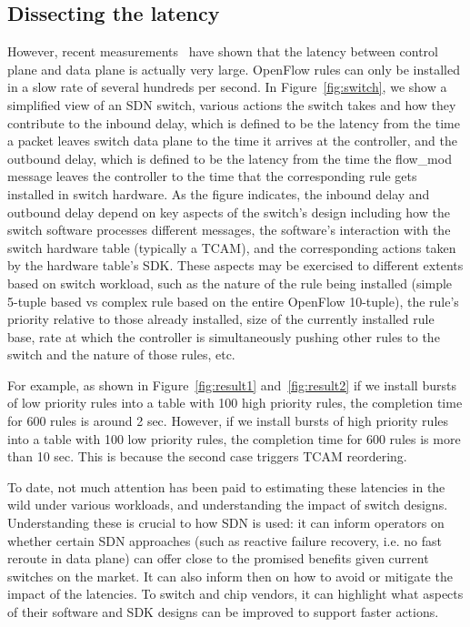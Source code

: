 \documentclass[onecolumn]{sig-alternate-10pt-onecolumn}
\begin{document}
\subsection{Dissecting the latency}
However, recent measurements~\cite{ucsdHiFi13} have shown that the latency between control plane
and data plane is actually very large. OpenFlow rules can only be installed in a
slow rate of several hundreds per second. 
In Figure~\ref{fig:switch}, we show a simplified view of an SDN switch,
various actions the switch takes and how they contribute to the inbound delay,
which is defined to be the latency from the time a packet leaves switch
data plane to the time it arrives at the controller, and the outbound delay,
 which is defined to be the latency 
from the time the flow\_mod message leaves the controller to the time that
the corresponding rule gets installed in switch hardware. As
the figure indicates, the inbound delay and outbound delay depend on key aspects of
the switch's design including how the switch software processes different
messages, the software's interaction with the switch hardware table (typically a
TCAM), and the corresponding actions taken by the hardware table's SDK.  These
aspects may be exercised to different extents based on switch workload, such as
the nature of the rule being installed (simple 5-tuple based vs complex rule
based on the entire OpenFlow 10-tuple), the rule's priority relative to those
already installed, size of the currently installed rule base, rate at which the
controller is simultaneously pushing other rules to the switch and the nature of
those rules, etc. 

For example, as shown in Figure~\ref{fig:result1} and~\ref{fig:result2} if we
install bursts of low priority rules into a table with 100 high priority rules,
the completion time for 600 rules is around 2 sec. However, if we install bursts
of high priority rules into a table with 100 low priority rules, the completion
time for 600 rules is more than 10 sec. This is because the second case triggers
TCAM reordering.

To date, not much attention has been paid to estimating these latencies in the
wild under various workloads, and understanding the impact of switch
designs.  Understanding these is crucial to how SDN is used: it can inform
operators on whether certain SDN approaches (such as reactive failure recovery,
i.e. no fast reroute in data plane) can offer close to the promised benefits
given current switches on the market.  It can also inform then on how to avoid
or mitigate the impact of the latencies. To switch and chip vendors, it can
highlight what aspects of their software and SDK designs can be improved to
support faster actions. 
\end{document}
